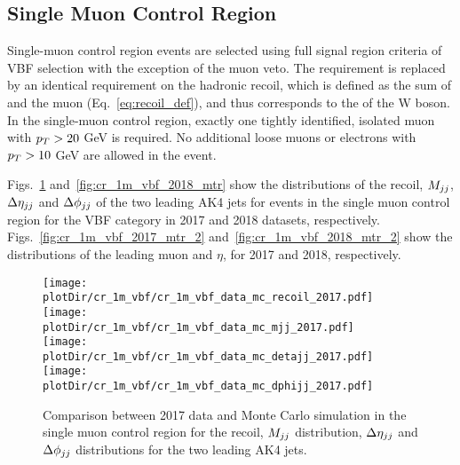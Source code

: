\clearpage

\subsection{Single Muon Control Region}
\label{sec:selection_cr_1m}

Single-muon control region events are selected using full signal region criteria of VBF selection with the exception of the muon veto. 
The \ptmiss requirement is replaced by an identical requirement on the hadronic recoil, which is defined as the sum of \ptvecmiss and the muon \vpt (Eq.~\ref{eq:recoil_def}), 
and thus corresponds to the \pt of the W boson.
In the single-muon control region, exactly one tightly identified, isolated muon with $p_T > 20$ GeV is required. 
No additional loose muons or electrons with $p_T > 10$ GeV are allowed in the event.

Figs.~\ref{fig:cr_1m_vbf_2017_mtr} and~\ref{fig:cr_1m_vbf_2018_mtr} show the distributions of the recoil, 
$M_{jj}$, $\Delta \eta_{jj}$ and $\Delta \phi_{jj}$ of the two leading AK4 jets for events in the single muon control region for the VBF category 
in 2017 and 2018 datasets, respectively.
Figs.~\ref{fig:cr_1m_vbf_2017_mtr_2} and~\ref{fig:cr_1m_vbf_2018_mtr_2} show the distributions of the leading muon \pt and $\eta$, 
for 2017 and 2018, respectively. 

\begin{figure}[htbp]
    \begin{center}
        \texttt{[image: \\plotDir/cr\_1m\_vbf/cr\_1m\_vbf\_data\_mc\_recoil\_2017.pdf]}
        \texttt{[image: \\plotDir/cr\_1m\_vbf/cr\_1m\_vbf\_data\_mc\_mjj\_2017.pdf]} \\
        \texttt{[image: \\plotDir/cr\_1m\_vbf/cr\_1m\_vbf\_data\_mc\_detajj\_2017.pdf]}
        \texttt{[image: \\plotDir/cr\_1m\_vbf/cr\_1m\_vbf\_data\_mc\_dphijj\_2017.pdf]}
    \end{center}
    \caption{Comparison between 2017 data and Monte Carlo simulation in the single muon control region for
        the recoil, $M_{jj}$ distribution, $\Delta \eta_{jj}$ and $\Delta \phi_{jj}$ distributions for the two leading AK4 jets.}
    \label{fig:cr_1m_vbf_2017_mtr}
\end{figure}

